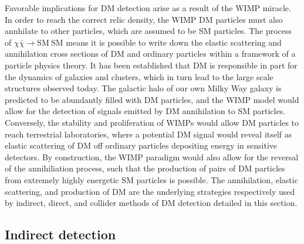 Favorable implications for DM detection arise as a result of the WIMP miracle. In order to reach the correct relic density, the WIMP DM particles must also annhilate to other particles, which are assumed to be SM particles. The process of $\chi \bar{\chi} \rightarrow \mathrm{SM}\:\mathrm{SM}$ means it is possible to write down the elastic scattering and annihilation cross sections of DM and ordinary particles within a framework of a particle physics theory. It has been established that DM is responsible in part for the dynamics of galaxies and clusters, which in turn lead to the large scale structures observed today. The galactic halo of our own Milky Way galaxy is predicted to be abundantly filled with DM particles, and the WIMP model would allow for the detection of signals emitted by DM annihilation to SM particles. Conversely, the stability and proliferation of WIMPs would allow DM particles to reach terrestrial laboratories, where a potential DM signal would reveal itself as elastic scattering of DM off ordinary particles depositing energy in sensitive detectors. By construction, the WIMP paradigm would also allow for the reversal of the annihiliation process, such that the production of pairs of DM particles from extremely highly energetic SM particles is possible. The annihilation, elastic scattering, and production of DM are the underlying strategies respectively used by indirect, direct, and collider methods of DM detection detailed in this section.

\subsection{Indirect detection}
\label{subsec:ID}

